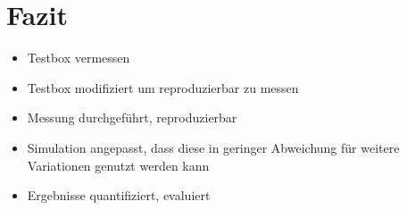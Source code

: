 \section{Fazit}
\begin{itemize}
	\item Testbox vermessen
	\item Testbox modifiziert um reproduzierbar zu messen
	\item Messung durchgef\"uhrt, reproduzierbar
	\item Simulation angepasst, dass diese in geringer Abweichung f\"ur weitere Variationen genutzt werden kann
	\item Ergebnisse quantifiziert, evaluiert
\end{itemize}
